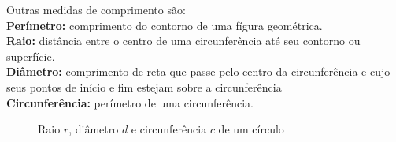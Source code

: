 \begin{multicols*}{2}
    \begin{table}[H]
    \end{table}
    Outras medidas de comprimento são: \\
    \textbf{Perímetro:} comprimento do contorno de uma fígura geométrica. \\
    \textbf{Raio:} distância entre o centro de uma circunferência até seu contorno ou superfície.\\
    \textbf{Diâmetro:} comprimento de reta que passe pelo centro da circunferência e cujo seus pontos de
    início e fim estejam sobre a circunferência\\
    \textbf{Circunferência:} perímetro de uma circunferência.\\

    \begin{figure}[H]
        \centering
        \caption{Raio $r$, diâmetro $d$ e circunferência $c$ de um círculo}
    \end{figure}


\end{multicols*}
